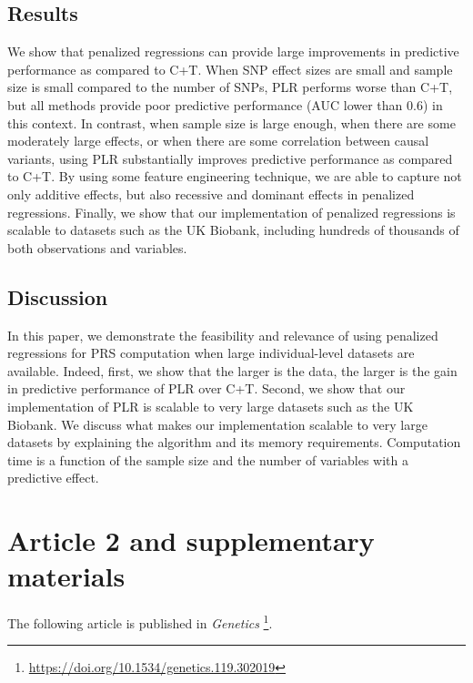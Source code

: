 \subsection{Results}

We show that penalized regressions can provide large improvements in predictive performance as compared to C+T. When SNP effect sizes are small and sample size is small compared to the number of SNPs, PLR performs worse than C+T, but all methods provide poor predictive performance (AUC lower than 0.6) in this context.
In contrast, when sample size is large enough, when there are some moderately large effects, or when there are some correlation between causal variants, using PLR substantially improves predictive performance as compared to C+T.
By using some feature engineering technique, we are able to capture not only additive effects, but also recessive and dominant effects in penalized regressions.
Finally, we show that our implementation of penalized regressions is scalable to datasets such as the UK Biobank, including hundreds of thousands of both observations and variables.

\subsection{Discussion}

In this paper, we demonstrate the feasibility and relevance of using penalized regressions for PRS computation when large individual-level datasets are available. Indeed, first, we show that the larger is the data, the larger is the gain in predictive performance of PLR over C+T. Second, we show that our implementation of PLR is scalable to very large datasets such as the UK Biobank.
We discuss what makes our implementation scalable to very large datasets by explaining the algorithm and its memory requirements.
Computation time is a function of the sample size and the number of variables with a predictive effect.


\section{Article 2 and supplementary materials}

The following article is published in \textit{Genetics}	\footnote{\url{https://doi.org/10.1534/genetics.119.302019}}.



